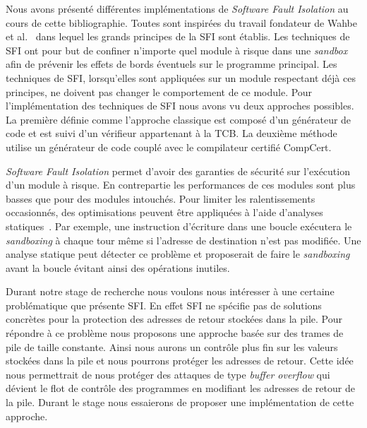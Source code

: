 \documentclass[11pt]{sdm}
\begin{document}
Nous avons présenté différentes implémentations de \textit{Software Fault Isolation} au cours de cette bibliographie. Toutes sont inspirées du travail fondateur de Wahbe et al.~\cite{Wahbe:1993:ESF:173668.168635} dans lequel les grands principes de la SFI sont établis. Les techniques de SFI ont pour but de confiner n'importe quel module à risque dans une \textit{sandbox} afin de prévenir les effets de bords éventuels sur le programme principal. Les techniques de SFI, lorsqu'elles sont appliquées sur un module respectant déjà ces principes, ne doivent pas changer le comportement de ce module.
Pour l'implémentation des techniques de SFI nous avons vu deux approches possibles. La première définie comme l'approche classique est composé d'un générateur de code et est suivi d'un vérifieur appartenant à la TCB. La deuxième méthode utilise un générateur de code couplé avec le compilateur certifié CompCert.

\textit{Software Fault Isolation} permet d'avoir des garanties de sécurité sur l'exécution d'un module à risque. En contrepartie les performances de ces modules sont plus basses que pour des modules intouchés. Pour limiter les ralentissements occasionnés, des optimisations peuvent être appliquées à l'aide d'analyses statiques~\cite{Abadi:2009:CIP:1609956.1609960}\cite{Zeng:2011:CCI:2046707.2046713}.
Par exemple, une instruction d'écriture dans une boucle exécutera le \textit{sandboxing} à chaque tour même si l'adresse de destination n'est pas modifiée. Une analyse statique peut détecter ce problème et proposerait de faire le \textit{sandboxing} avant la boucle évitant ainsi des opérations inutiles.

Durant notre stage de recherche nous voulons nous intéresser à une certaine problématique que présente SFI. En effet SFI ne spécifie pas de solutions concrètes pour la protection des adresses de retour stockées dans la pile. Pour répondre à ce problème nous proposons une approche basée sur des trames de pile de taille constante. Ainsi nous aurons un contrôle plus fin sur les valeurs stockées dans la pile et nous pourrons protéger les adresses de retour. Cette idée nous permettrait de nous protéger des attaques de type \textit{buffer overflow} qui dévient le flot de contrôle des programmes en modifiant les adresses de retour de la pile. Durant le stage nous essaierons de proposer une implémentation de cette approche.
  


\end{document}
